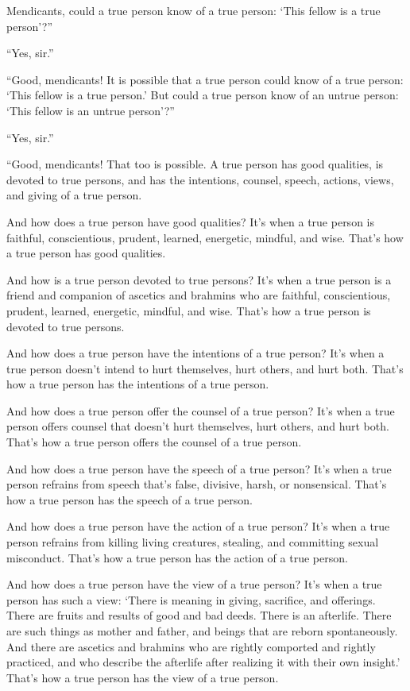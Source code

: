 \documentclass[12pt,openany]{book}%
\begin{document}
Mendicants, could a true person know of a true person: ‘This fellow is a true person’?” 

“Yes, sir.” 

“Good, mendicants! It is possible that a true person could know of a true person: ‘This fellow is a true person.’ But could a true person know of an untrue person: ‘This fellow is an untrue person’?” 

“Yes, sir.” 

“Good, mendicants! That too is possible. A true person has good qualities, is devoted to true persons, and has the intentions, counsel, speech, actions, views, and giving of a true person. 

And how does a true person have good qualities? It’s when a true person is faithful, conscientious, prudent, learned, energetic, mindful, and wise. That’s how a true person has good qualities. 

And how is a true person devoted to true persons? It’s when a true person is a friend and companion of ascetics and brahmins who are faithful, conscientious, prudent, learned, energetic, mindful, and wise. That’s how a true person is devoted to true persons. 

And how does a true person have the intentions of a true person? It’s when a true person doesn’t intend to hurt themselves, hurt others, and hurt both. That’s how a true person has the intentions of a true person. 

And how does a true person offer the counsel of a true person? It’s when a true person offers counsel that doesn’t hurt themselves, hurt others, and hurt both. That’s how a true person offers the counsel of a true person. 

And how does a true person have the speech of a true person? It’s when a true person refrains from speech that’s false, divisive, harsh, or nonsensical. That’s how a true person has the speech of a true person. 

And how does a true person have the action of a true person? It’s when a true person refrains from killing living creatures, stealing, and committing sexual misconduct. That’s how a true person has the action of a true person. 

And how does a true person have the view of a true person? It’s when a true person has such a view: ‘There is meaning in giving, sacrifice, and offerings. There are fruits and results of good and bad deeds. There is an afterlife. There are such things as mother and father, and beings that are reborn spontaneously. And there are ascetics and brahmins who are rightly comported and rightly practiced, and who describe the afterlife after realizing it with their own insight.’ That’s how a true person has the view of a true person. 
\end{document}
